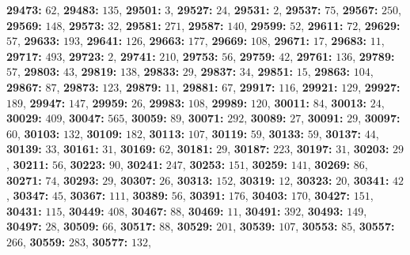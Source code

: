 \textsf{\bfseries 29473:} $62$, \textsf{\bfseries 29483:} $135$, \textsf{\bfseries 29501:} $3$, \textsf{\bfseries 29527:} $24$, \textsf{\bfseries 29531:} $2$, \textsf{\bfseries 29537:} $75$, \textsf{\bfseries 29567:} $250$, \textsf{\bfseries 29569:} $148$, \textsf{\bfseries 29573:} $32$, \textsf{\bfseries 29581:} $271$, \textsf{\bfseries 29587:} $140$, \textsf{\bfseries 29599:} $52$, \textsf{\bfseries 29611:} $72$, \textsf{\bfseries 29629:} $57$, \textsf{\bfseries 29633:} $193$, \textsf{\bfseries 29641:} $126$, \textsf{\bfseries 29663:} $177$, \textsf{\bfseries 29669:} $108$, \textsf{\bfseries 29671:} $17$, \textsf{\bfseries 29683:} $11$, \textsf{\bfseries 29717:} $493$, \textsf{\bfseries 29723:} $2$, \textsf{\bfseries 29741:} $210$, \textsf{\bfseries 29753:} $56$, \textsf{\bfseries 29759:} $42$, \textsf{\bfseries 29761:} $136$, \textsf{\bfseries 29789:} $57$, \textsf{\bfseries 29803:} $43$, \textsf{\bfseries 29819:} $138$, \textsf{\bfseries 29833:} $29$, \textsf{\bfseries 29837:} $34$, \textsf{\bfseries 29851:} $15$, \textsf{\bfseries 29863:} $104$, \textsf{\bfseries 29867:} $87$, \textsf{\bfseries 29873:} $123$, \textsf{\bfseries 29879:} $11$, \textsf{\bfseries 29881:} $67$, \textsf{\bfseries 29917:} $116$, \textsf{\bfseries 29921:} $129$, \textsf{\bfseries 29927:} $189$, \textsf{\bfseries 29947:} $147$, \textsf{\bfseries 29959:} $26$, \textsf{\bfseries 29983:} $108$, \textsf{\bfseries 29989:} $120$, \textsf{\bfseries 30011:} $84$, \textsf{\bfseries 30013:} $24$, \textsf{\bfseries 30029:} $409$, \textsf{\bfseries 30047:} $565$, \textsf{\bfseries 30059:} $89$, \textsf{\bfseries 30071:} $292$, \textsf{\bfseries 30089:} $27$, \textsf{\bfseries 30091:} $29$, \textsf{\bfseries 30097:} $60$, \textsf{\bfseries 30103:} $132$, \textsf{\bfseries 30109:} $182$, \textsf{\bfseries 30113:} $107$, \textsf{\bfseries 30119:} $59$, \textsf{\bfseries 30133:} $59$, \textsf{\bfseries 30137:} $44$, \textsf{\bfseries 30139:} $33$, \textsf{\bfseries 30161:} $31$, \textsf{\bfseries 30169:} $62$, \textsf{\bfseries 30181:} $29$, \textsf{\bfseries 30187:} $223$, \textsf{\bfseries 30197:} $31$, \textsf{\bfseries 30203:} $29$, \textsf{\bfseries 30211:} $56$, \textsf{\bfseries 30223:} $90$, \textsf{\bfseries 30241:} $247$, \textsf{\bfseries 30253:} $151$, \textsf{\bfseries 30259:} $141$, \textsf{\bfseries 30269:} $86$, \textsf{\bfseries 30271:} $74$, \textsf{\bfseries 30293:} $29$, \textsf{\bfseries 30307:} $26$, \textsf{\bfseries 30313:} $152$, \textsf{\bfseries 30319:} $12$, \textsf{\bfseries 30323:} $20$, \textsf{\bfseries 30341:} $42$, \textsf{\bfseries 30347:} $45$, \textsf{\bfseries 30367:} $111$, \textsf{\bfseries 30389:} $56$, \textsf{\bfseries 30391:} $176$, \textsf{\bfseries 30403:} $170$, \textsf{\bfseries 30427:} $151$, \textsf{\bfseries 30431:} $115$, \textsf{\bfseries 30449:} $408$, \textsf{\bfseries 30467:} $88$, \textsf{\bfseries 30469:} $11$, \textsf{\bfseries 30491:} $392$, \textsf{\bfseries 30493:} $149$, \textsf{\bfseries 30497:} $28$, \textsf{\bfseries 30509:} $66$, \textsf{\bfseries 30517:} $88$, \textsf{\bfseries 30529:} $201$, \textsf{\bfseries 30539:} $107$, \textsf{\bfseries 30553:} $85$, \textsf{\bfseries 30557:} $266$, \textsf{\bfseries 30559:} $283$, \textsf{\bfseries 30577:} $132$, 
